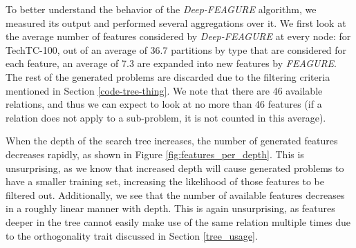 \documentclass[twoside,11pt]{article}
\theoremstyle{definition}
\begin{document}

To better understand the behavior of the \emph{Deep-FEAGURE} algorithm, we measured its output and performed several aggregations over it.
We first look at the average number of features considered by \emph{Deep-FEAGURE} at every node: for TechTC-100, out of an average of 36.7 partitions by type that are considered for each feature, an average of 7.3 are expanded into new features by \emph{FEAGURE}. The rest of the generated problems are discarded due to the filtering criteria mentioned in Section \ref{code-tree-thing}.
We note that there are 46 available relations, and thus we can expect to look at no more than 46 features (if a relation does not apply to a sub-problem, it is not counted in this average). 

When the depth of the search tree increases, the number of generated features decreases rapidly, as shown in Figure \ref{fig:features_per_depth}.
This is unsurprising, as we know that increased depth will cause generated problems to have a smaller training set, increasing the likelihood of those features to be filtered out. Additionally, we see that the number of available features decreases in a roughly linear manner with depth. This is again unsurprising, as features deeper in the tree cannot easily make use of the same relation multiple times due to the orthogonality trait discussed in Section \ref{tree_usage}.
\end{document}
